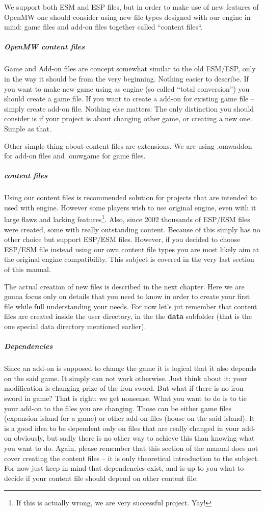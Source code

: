 We support both ESM and ESP files, but in order to make use of new features of OpenMW one should consider using new file types designed
with our engine in mind: game files and add-on files together called ``content files``.

\subparagraph{OpenMW content files}
Game and Add-on files are concept somewhat similar to the old ESM/ESP, only in the way it should be from the very beginning. Nothing easier
to describe. If you want to make new game using \OMW{} as engine (so called ``total conversion'') you should create a game file.
If you want to create a add-on for existing game file -- simply create add-on file. Nothing else matters: The only distinction you should
consider is if your project is about changing other game, or creating a new one. Simple as that.

Other simple thing about content files are extensions. We are using .omwaddon for add-on files and .omwgame for game files.

\subparagraph{\MW{} content files}
Using our content files is recommended solution for projects that are intended to used with \OMW{} engine. However some players
wish to use original \MW{} engine, even with it large flaws and lacking features\footnote{If this is actually wrong, we are very
successful project. Yay!}. Also, since 2002 thousands of ESP/ESM files were created, some with really outstanding content.
Because of this \OCS{} simply has no other choice but support ESP/ESM files. However, if you decided to choose ESP/ESM file instead
using our own content file types you are most likely aim at the original engine compatibility. This subject is covered in the very
last section of this manual. %

The actual creation of new files is described in the next chapter. Here we are gonna focus only on details that you need to know
in order to create your first \OCS{} file while full understanding your needs. For now let's jut remember that content files
are created inside the user directory, in the the \textbf{data} subfolder (that is the one special data directory mentioned earlier).

\subparagraph{Dependencies}
Since an add-on is supposed to change the game it is logical that it also depends on the said game. It simply can not work otherwise.
Just think about it: your modification is changing prize of the iron sword. But what if there is no iron sword in game? That is right:
we get nonsense. What you want to do is to tie your add-on to the files you are changing. Those can be either game files (expansion island
for a game) or other add-on files (house on the said island). It is a good idea to be dependent only on files that are really changed
in your add-on obviously, but sadly there is no other way to achieve this than knowing what you want to do. Again, please remember that
this section of the manual does not cover creating the content files -- it is only theoretical introduction to the subject. For now just
keep in mind that dependencies exist, and is up to you what to decide if your content file should depend on other content file.

